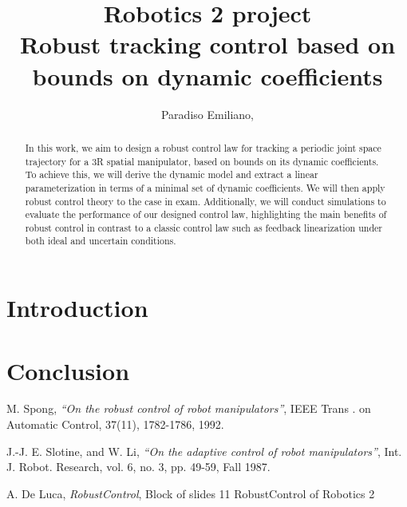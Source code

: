 \documentclass{article}
\author{Paradiso Emiliano, \quad 1940454}
\title{\Huge Robotics 2 project \\ \centering \Large \textbf{Robust tracking control based on bounds on dynamic coefficients}}
\begin{document}
\maketitle
\vspace{2cm}

\begin{abstract}
\hspace*{-0.5cm}In this work, we aim to design a robust control law for tracking a periodic joint space trajectory for a 3R spatial manipulator, based on bounds on its dynamic coefficients. To achieve this, we will derive the dynamic model and extract a linear parameterization in terms of a minimal set of dynamic coefficients. We will then apply robust control theory to the case in exam. Additionally, we will conduct simulations to evaluate the performance of our designed control law, highlighting the main benefits of robust control in contrast to a classic control law such as feedback linearization under both ideal and uncertain conditions.
\end{abstract}

\newpage
\tableofcontents
\newpage
\section{Introduction}


\section{Conclusion}



\begin{thebibliography}{9}

  M. Spong,
  \emph{“On the robust control of robot manipulators”},
   IEEE Trans . on Automatic Control, 37(11), 1782-1786, 1992.

  J.-J. E. Slotine, and W. Li,
  \emph{“On the adaptive control of robot manipulators”},
  Int. J. Robot. Research, vol. 6, no. 3, pp. 49-59, Fall 1987.
   
  A. De Luca,
  \emph{RobustControl},
 Block of slides 11 RobustControl of Robotics 2

\end{thebibliography}
\end{document}
